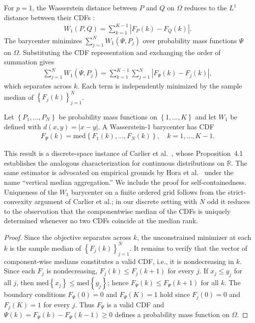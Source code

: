 For $p=1$, the Wasserstein distance between $P$ and $Q$ on $\Omega$ reduces to the $L^1$ distance between their CDFs \cite{vallender73,panaretos19}:
\begin{align*}
W_1(P,Q)=\sum_{k=1}^{K-1}\left|F_P(k)-F_Q(k)\right|.
\end{align*}
The barycenter minimizes $\sum_{j=1}^N W_1(\Psi,P_j)$ over probability mass functions $\Psi$ on $\Omega$.  Substituting the CDF representation and exchanging the order of summation gives
\begin{align*}
\sum_{j=1}^N W_1(\Psi,P_j)=\sum_{k=1}^{K-1}\sum_{j=1}^N\left|F_\Psi(k)-F_j(k)\right|,
\end{align*}
which separates across $k$.  Each term is independently minimized by the sample median of $\left\{F_j(k)\right\}_{j=1}^N$.

\begin{proposition}
\label{prop:w1}
Let $\left\{P_1,\ldots,P_N\right\}$ be probability mass functions on $\left\{1,\ldots,K\right\}$ and let $W_1$ be defined with $d(x,y)=|x-y|$.  A Wasserstein-1 barycenter has CDF
\begin{align*}
F_\Psi(k)=\mathrm{med}\left\{F_1(k),\ldots,F_N(k)\right\},\quad k=1,\ldots,K-1.
\end{align*}
\end{proposition}
\begin{remark}
This result is a discrete-space instance of Carlier et al.\ \cite{carlier23}, whose Proposition~4.1 establishes the analogous characterization for continuous distributions on $\mathbb{R}$.  The same estimator is advocated on empirical grounds by Hora et al.\ \cite{hora13} under the name ``vertical median aggregation.''  We include the proof for self-containedness.  Uniqueness of the $W_1$ barycenter on a finite ordered grid follows from the strict-convexity argument of Carlier et al.; in our discrete setting with $N$ odd it reduces to the observation that the componentwise median of the CDFs is uniquely determined whenever no two CDFs coincide at the median rank.
\end{remark}
\begin{proof}
Since the objective separates across $k$, the unconstrained minimizer at each $k$ is the sample median of $\left\{F_j(k)\right\}_{j=1}^N$.  It remains to verify that the vector of component-wise medians constitutes a valid CDF, i.e., it is nondecreasing in $k$.  Since each $F_j$ is nondecreasing, $F_j(k)\leq F_j(k+1)$ for every $j$.  If $x_j\leq y_j$ for all $j$, then $\mathrm{med}\left\{x_j\right\}\leq\mathrm{med}\left\{y_j\right\}$; hence $F_\Psi(k)\leq F_\Psi(k+1)$ for all $k$.  The boundary conditions $F_\Psi(0)=0$ and $F_\Psi(K)=1$ hold since $F_j(0)=0$ and $F_j(K)=1$ for every $j$.  Thus $F_\Psi$ is a valid CDF and $\Psi(k)=F_\Psi(k)-F_\Psi(k-1)\geq 0$ defines a probability mass function on $\Omega$.
\end{proof}

